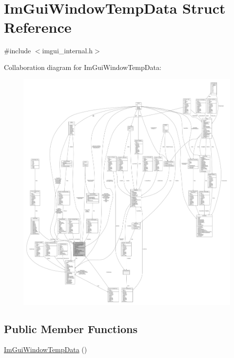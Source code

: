 \hypertarget{struct_im_gui_window_temp_data}{}\section{Im\+Gui\+Window\+Temp\+Data Struct Reference}
\label{struct_im_gui_window_temp_data}


{\ttfamily \#include $<$imgui\+\_\+internal.\+h$>$}



Collaboration diagram for Im\+Gui\+Window\+Temp\+Data\+:
\nopagebreak
\begin{figure}[H]
\begin{center}
\leavevmode
\includegraphics[width=350pt]{struct_im_gui_window_temp_data__coll__graph}
\end{center}
\end{figure}
\subsection*{Public Member Functions}
\begin{DoxyCompactItemize}
\item 
\mbox{\hyperlink{struct_im_gui_window_temp_data_a38a3703e2a34a04f7df748ce7085bc2e}{Im\+Gui\+Window\+Temp\+Data}} ()
\end{DoxyCompactItemize}
